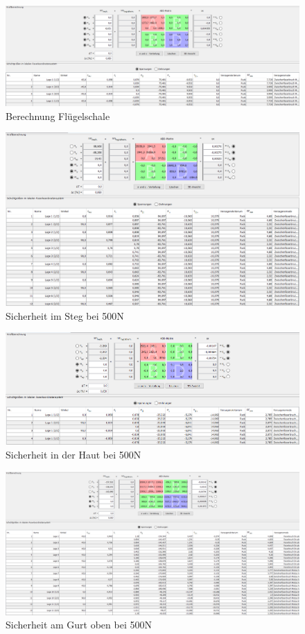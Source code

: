\begin{figure}[h]
	\includegraphics[width=1.0\textwidth]{Bilder/Berechnung Haut.png}
	\caption{Berechnung Flügelschale}
	\label{fig:Berechnung Haut}
\end{figure}
\begin{figure}[h]
	\centering
	\includegraphics[width=1\textwidth]{Bilder/sicher1}
	\caption{Sicherheit im Steg bei 500N}
	\label{sicher-steg}
\end{figure}
\begin{figure}[h]
	\centering
	\includegraphics[width=1\textwidth]{Bilder/sicher2}
	\caption{Sicherheit in der Haut bei 500N}
\end{figure}
\begin{figure}[h]
	\centering
	\includegraphics[width=1\textwidth]{Bilder/sicher3}
	\caption{Sicherheit am Gurt oben bei 500N}
\end{figure}
